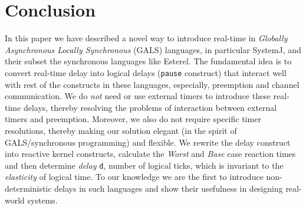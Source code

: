 \section{Conclusion}
\label{sec:concl-future-work}

In this paper we have described a novel way to introduce real-time in
\textit{Globally Asynchronous Locally Synchronous} (GALS) languages, in
particular SystemJ, and their subset the synchronous languages like
Esterel. The fundamental idea is to convert real-time delay into logical
delays (\texttt{pause} construct) that interact well with rest of the
constructs in these languages, especially, preemption and channel
communication. We do \textit{not} need or use external timers to
introduce these real-time delays, thereby resolving the problems of
interaction between external timers and preemption. Moreover, we also do
not require specific timer resolutions, thereby making our solution
elegant (in the spirit of GALS/synchronous programming) and flexible. We
rewrite the delay construct into reactive kernel constructs, calculate
the \textit{Worst} and \textit{Base} case reaction times and then
determine \textit{delay} \texttt{d}, number of logical ticks, which is
invariant to the \textit{elasticity} of logical time. To our knowledge
we are the first to introduce non-deterministic delays in such languages
and show their usefulness in designing real-world systems.


